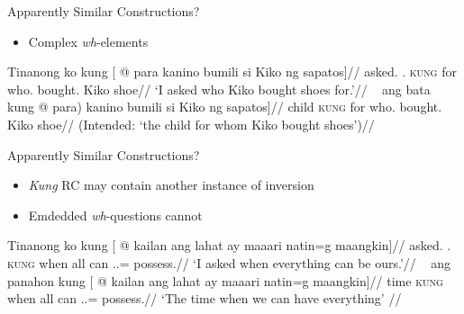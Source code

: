 \documentclass[pdf]{beamer}
\newcommand{\g}[1]{\textsc{#1}}
\newcommand{\Ng}{\Gen}
\newcommand{\Ko}{\Fsg.\Ng}    \newcommand{\Namin}{\Fpl.\Excl.\Ng}
\newcommand{\Natin}{\Fpl.\Incl.\Ng}
\begin{document}
\begin{frame}{Apparently Similar Constructions?}
  \begin{itemize}
    \item Complex \textit{wh}-elements
  \end{itemize}
  \ex\begingl
    \gla  Tinanong ko kung [ @ para kanino bumili si Kiko ng sapatos]//
    \glb  asked.\Pv{} \Ko{} \g{kung} for who.\Obl{} bought.\Av{} \Nom{} Kiko \Gen{} shoe//
    \glft `I asked who Kiko bought shoes for.'//
  \endgl
  \xe
  \ex~\ljudge{*}\begingl
    \gla  ang bata kung \nogloss{[(} @ para) kanino bumili si Kiko ng sapatos]//
    \glb  \Nom{} child \g{kung} for who.\Obl{} bought.\Av{} \Nom{} Kiko \Gen{} shoe//
    \glft (Intended: `the child for whom Kiko bought shoes')//
  \endgl
  \xe
\end{frame}

\begin{frame}{Apparently Similar Constructions?}
  \begin{itemize}
    \item \textit{Kung} RC may contain another instance of inversion
    \item Emdedded \textit{wh}-questions cannot
  \end{itemize}
  \ex{}\begingl
    \gla  Tinanong ko kung [ @ kailan ang lahat ay maaari natin=g maangkin]//
    \glb  asked.\Pv{} \Ko{} \g{kung} when \Nom{} all \Ay{} can \Natin=\Lk{} possess.\Pv{}//
    \glft `I asked when everything can be ours.'//
  \endgl
  \xe
  \ex~\begingl
    \gla  ang panahon kung [ @ kailan ang lahat ay maaari natin=g maangkin]//
    \glb  \Nom{} time \g{kung} when \Nom{} all \Ay{} can \Natin=\Lk{} possess.\Pv{}//
    \glft `The time when we can have everything'
          //
  \endgl
  \xe
\end{frame}
\end{document}
